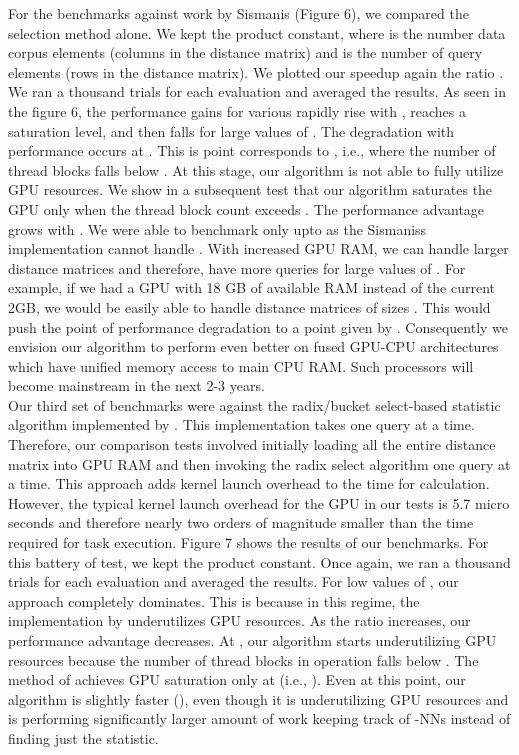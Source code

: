 \documentclass[10pt]{article}
\begin{document}
For the benchmarks against work by Sismanis (Figure 6), we compared the selection method alone. We kept the product  constant, where  is the number data corpus elements (columns in the distance matrix) and  is the number of query elements (rows in the distance matrix). We plotted our speedup again the ratio .  We ran a thousand trials for each evaluation and averaged the results. As seen in the figure 6, the performance gains for various  rapidly rise with  , reaches a saturation level, and then falls for large values of  . The degradation with performance occurs at  . This is point corresponds to , i.e., where the number of thread blocks falls below . At this stage, our algorithm is not able to fully utilize GPU resources. We show in a subsequent test that our algorithm saturates the GPU only when the thread block count exceeds . The performance advantage grows with . We were able to benchmark only upto  as the Sismaniss implementation cannot handle .  With increased GPU RAM, we can handle larger distance matrices and therefore, have more queries  for large values of . For example, if we had a GPU with 18 GB of available RAM instead of the current 2GB, we would be easily able to handle distance matrices of sizes . This would push the point of performance degradation to a point given by .  Consequently we envision our algorithm to perform even better on fused GPU-CPU architectures which have unified memory access to main CPU RAM. Such processors will become mainstream in the next 2-3 years.\\

 
Our third set of benchmarks were against the radix/bucket select-based  statistic algorithm implemented by \cite{Alabi:2012}. This implementation takes one query at a time. Therefore, our comparison tests involved initially loading all the entire distance matrix into GPU RAM and then invoking the radix select algorithm one query at a time. This approach adds kernel launch overhead to the time for calculation. However, the typical kernel launch overhead for the GPU  in our tests is 5.7 micro seconds and therefore nearly two orders of magnitude smaller than the time required for task execution. Figure 7 shows the results of our benchmarks. For this battery of test, we kept the product  constant. Once again, we ran a thousand trials for each evaluation and averaged the results.  For low values of , our approach completely dominates. This is because in this regime, the implementation by \cite{Alabi:2012} underutilizes GPU resources. As the ratio  increases, our performance advantage decreases. At , our algorithm starts underutilizing GPU resources because the number of thread blocks in operation falls below . The method of \cite{Alabi:2012} achieves GPU saturation only at  (i.e., ). Even at this point, our algorithm is slightly faster (), even though it is underutilizing GPU resources and is performing significantly larger amount of work keeping track of -NNs instead of finding just the  statistic.\\
\end{document}
